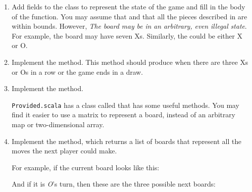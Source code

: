 \documentclass{book}
\begin{document}
\begin{enumerate}

\item
   Add fields to the  class to represent the state of the game and
   fill in the body of the  function.
   You may assume that  and that all the pieces described
   in  are within bounds. However, \emph{The board may be in an
   arbitrary, even illegal state}. For example, the board may have seven Xs.
   Similarly, the  could be either X or O.


\item Implement the  method. This method
  should produce  when there are three Xs or Os in a row
  or the game ends in a draw.


\item Implement the  method.

   \texttt{Provided.scala} has a class called  that
   has some useful methods. You may find it easier to use a matrix to represent
   a board, instead of an arbitrary map or two-dimensional array.

\item Implement the  method, which returns a list of
   boards that represent all the moves the next player could make.

   For example, if the current board looks like this:


And if it is \emph{O}'s turn, then these are the three possible next boards:


\end{enumerate}
\end{document}
